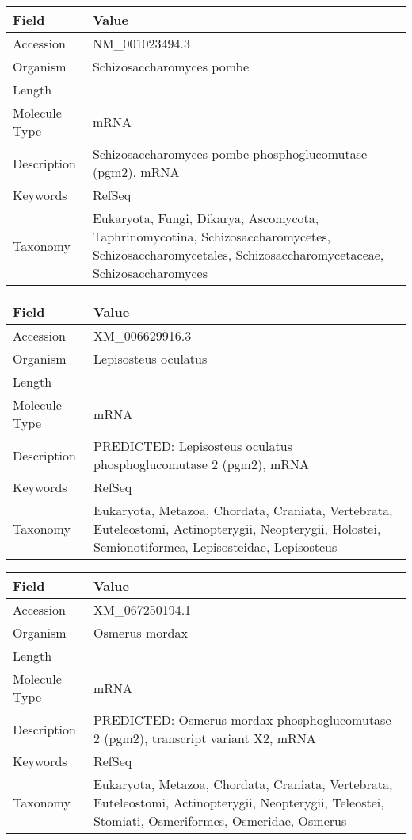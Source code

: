 \documentclass[10pt]{article}
\begin{document}
\vspace{1em}
{\footnotesize
\begin{longtable}{>{\raggedright\arraybackslash}p{4.5cm} >{\raggedright\arraybackslash}p{11.5cm}}
\textbf{Field} & \textbf{Value} \\
\hline
Accession & NM\_001023494.3 \\
Organism & Schizosaccharomyces pombe \\
Length & 1907 \\
Molecule Type & mRNA \\
Description & Schizosaccharomyces pombe phosphoglucomutase (pgm2), mRNA \\
Keywords & RefSeq \\
Taxonomy & Eukaryota, Fungi, Dikarya, Ascomycota, Taphrinomycotina, Schizosaccharomycetes, Schizosaccharomycetales, Schizosaccharomycetaceae, Schizosaccharomyces \\
\end{longtable}
}

\vspace{1em}
{\footnotesize
\begin{longtable}{>{\raggedright\arraybackslash}p{4.5cm} >{\raggedright\arraybackslash}p{11.5cm}}
\textbf{Field} & \textbf{Value} \\
\hline
Accession & XM\_006629916.3 \\
Organism & Lepisosteus oculatus \\
Length & 4968 \\
Molecule Type & mRNA \\
Description & PREDICTED: Lepisosteus oculatus phosphoglucomutase 2 (pgm2), mRNA \\
Keywords & RefSeq \\
Taxonomy & Eukaryota, Metazoa, Chordata, Craniata, Vertebrata, Euteleostomi, Actinopterygii, Neopterygii, Holostei, Semionotiformes, Lepisosteidae, Lepisosteus \\
\end{longtable}
}

\vspace{1em}
{\footnotesize
\begin{longtable}{>{\raggedright\arraybackslash}p{4.5cm} >{\raggedright\arraybackslash}p{11.5cm}}
\textbf{Field} & \textbf{Value} \\
\hline
Accession & XM\_067250194.1 \\
Organism & Osmerus mordax \\
Length & 2370 \\
Molecule Type & mRNA \\
Description & PREDICTED: Osmerus mordax phosphoglucomutase 2 (pgm2), transcript variant X2, mRNA \\
Keywords & RefSeq \\
Taxonomy & Eukaryota, Metazoa, Chordata, Craniata, Vertebrata, Euteleostomi, Actinopterygii, Neopterygii, Teleostei, Stomiati, Osmeriformes, Osmeridae, Osmerus \\
\end{longtable}
}
\end{document}
